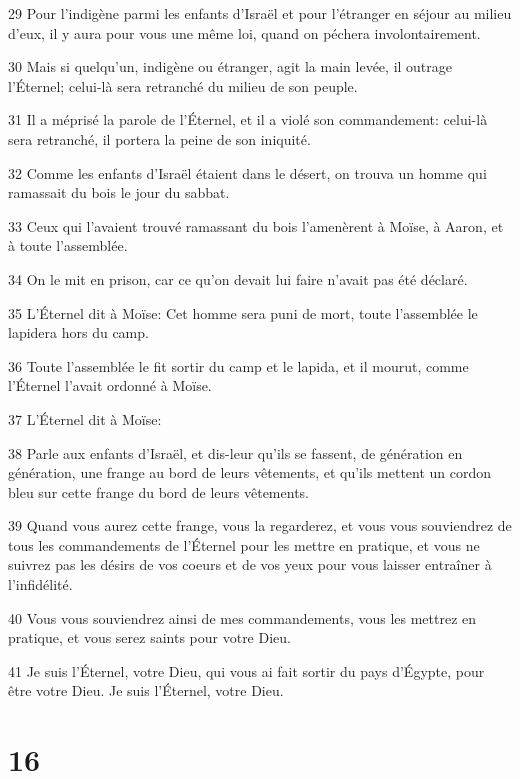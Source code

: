 \par 29 Pour l'indigène parmi les enfants d'Israël et pour l'étranger en séjour au milieu d'eux, il y aura pour vous une même loi, quand on péchera involontairement.
\par 30 Mais si quelqu'un, indigène ou étranger, agit la main levée, il outrage l'Éternel; celui-là sera retranché du milieu de son peuple.
\par 31 Il a méprisé la parole de l'Éternel, et il a violé son commandement: celui-là sera retranché, il portera la peine de son iniquité.
\par 32 Comme les enfants d'Israël étaient dans le désert, on trouva un homme qui ramassait du bois le jour du sabbat.
\par 33 Ceux qui l'avaient trouvé ramassant du bois l'amenèrent à Moïse, à Aaron, et à toute l'assemblée.
\par 34 On le mit en prison, car ce qu'on devait lui faire n'avait pas été déclaré.
\par 35 L'Éternel dit à Moïse: Cet homme sera puni de mort, toute l'assemblée le lapidera hors du camp.
\par 36 Toute l'assemblée le fit sortir du camp et le lapida, et il mourut, comme l'Éternel l'avait ordonné à Moïse.
\par 37 L'Éternel dit à Moïse:
\par 38 Parle aux enfants d'Israël, et dis-leur qu'ils se fassent, de génération en génération, une frange au bord de leurs vêtements, et qu'ils mettent un cordon bleu sur cette frange du bord de leurs vêtements.
\par 39 Quand vous aurez cette frange, vous la regarderez, et vous vous souviendrez de tous les commandements de l'Éternel pour les mettre en pratique, et vous ne suivrez pas les désirs de vos coeurs et de vos yeux pour vous laisser entraîner à l'infidélité.
\par 40 Vous vous souviendrez ainsi de mes commandements, vous les mettrez en pratique, et vous serez saints pour votre Dieu.
\par 41 Je suis l'Éternel, votre Dieu, qui vous ai fait sortir du pays d'Égypte, pour être votre Dieu. Je suis l'Éternel, votre Dieu.

\chapter{16}

